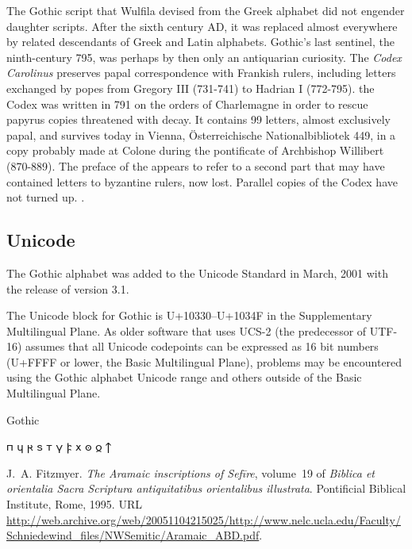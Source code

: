 The Gothic script that Wulfila devised from the Greek
alphabet did not engender daughter scripts. After the sixth century
AD, it was replaced almost everywhere by related descendants
of Greek and Latin alphabets. Gothic’s last sentinel, the
ninth-century  795, was perhaps by then
only an antiquarian curiosity. The \emph{Codex Carolinus} preserves papal correspondence
with Frankish rulers, including letters exchanged by popes from Gregory III (731-741) to Hadrian I (772-795). the Codex was written in 791 on the orders of Charlemagne in order to rescue papyrus copies threatened with decay. It contains 99 letters, almost exclusively papal, and survives today in Vienna, \"Osterreichische Nationalbibliotek 449, in a copy probably made at Colone during the pontificate of Archbishop Willibert (870-889). The preface of the  appears to refer to a second part that may have contained letters to byzantine rulers, now lost. Parallel copies of the Codex have not turned up. \citep{jasper2001papal}. 

\subsection{Unicode}

The Gothic alphabet was added to the Unicode Standard in March, 2001 with the release of version 3.1.

The Unicode block for Gothic is U+10330–U+1034F in the Supplementary Multilingual Plane. As older software that uses UCS-2 (the predecessor of UTF-16) assumes that all Unicode codepoints can be expressed as 16 bit numbers (U+FFFF or lower, the Basic Multilingual Plane), problems may be encountered using the Gothic alphabet Unicode range and others outside of the Basic Multilingual Plane.

\begin{scriptexample}[]{Gothic}
\end{scriptexample}
{\gothicfamily
𐍀	𐍁	𐍂	𐍃	𐍄	𐍅	𐍆	𐍇	𐍈	𐍉	𐍊}

\begin{thebibliography}
J.~A. Fitzmyer.
\newblock \emph{The Aramaic inscriptions of Sefīre}, volume~19 of
  \emph{Biblica et orientalia Sacra Scriptura antiquitatibus orientalibus
  illustrata}.
\newblock Pontificial Biblical Institute, Rome, 1995.
\newblock URL
  \url{http://web.archive.org/web/20051104215025/http://www.nelc.ucla.edu/Faculty/Schniedewind_files/NWSemitic/Aramaic_ABD.pdf}.
\end{thebibliography}  




